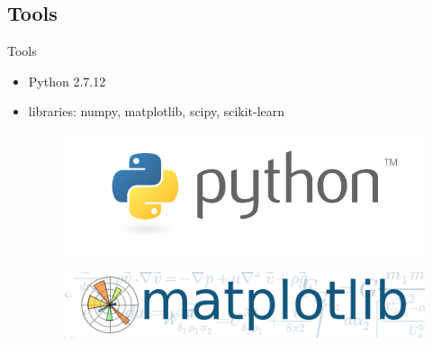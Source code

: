 \documentclass[xcolor=x11names,compress]{beamer}
\renewcommand{\(}{\begin{columns}}
\renewcommand{\)}{\end{columns}}
\newcommand{\<}[1]{\begin{column}{#1}}
\renewcommand{\>}{\end{column}}
\begin{document}
\subsection{Tools}
\begin{frame}{Tools}
	\begin{itemize}
		\item{Python 2.7.12} %

		\item{libraries: numpy, matplotlib, scipy, scikit-learn
				
                    \begin{figure}
                    \centering
                    \begin{minipage}{.3\textwidth}
                    \includegraphics[width=\linewidth]{python.png}
                    \label{fig:test1}
                    \end{minipage}\hfill
                    \begin{minipage}{.3\textwidth}
                    \includegraphics[width=\linewidth]{matplotlib.png}
                    \label{fig:test3}
                    \end{minipage}
                    \end{figure}			

}
\end{itemize}
\end{frame}
\end{document}
